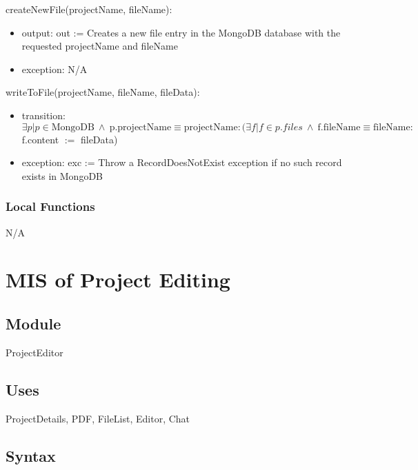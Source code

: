 \documentclass[12pt, titlepage]{article}
\begin{document}
	\noindent createNewFile(projectName, fileName):
	\begin{itemize}
		
		\item output: out := Creates a new file entry in the MongoDB database with the requested projectName and fileName
		
		\item exception: N/A
		
	\end{itemize}
	
	\noindent writeToFile(projectName, fileName, fileData):
	\begin{itemize}
		
		\item transition: $\exists p| p \in \text{MongoDB} ~\land~ \text{p.projectName} \equiv \text{projectName}: (\exists f| f \in p.files ~\land ~ \text{f.fileName} \equiv \text{fileName}:  $ f.content $:=$ fileData)
		
		\item exception: exc := Throw a RecordDoesNotExist exception if no such record exists in MongoDB
		
	\end{itemize}
	
	\subsubsection{Local Functions}
	
	N/A
	
	\newpage
	
	\section{MIS of Project Editing} \label{Module} 
	
	\subsection{Module}
	
	ProjectEditor
	
	\subsection{Uses}
	ProjectDetails, PDF, FileList, Editor, Chat
	
	\subsection{Syntax}
	
\end{document}
